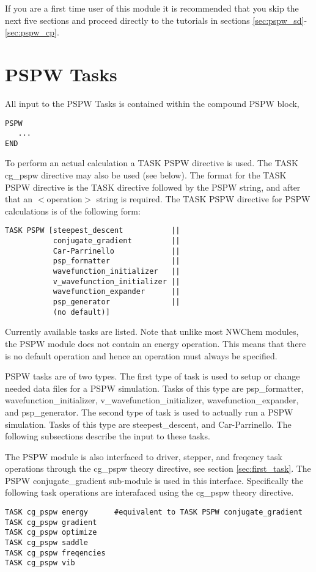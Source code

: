 If you are a first time user of this module it is recommended that you skip
the next five sections and proceed directly to the tutorials in sections 
\ref{sec:pspw_sd}-\ref{sec:pspw_cp}.

\section{PSPW Tasks}
\label{sec:pspw_tasks}

All input to the PSPW Tasks is contained within the compound PSPW  block,
\begin{verbatim}
PSPW
   ...
END
\end{verbatim}

To perform an actual calculation a TASK PSPW directive is used.  The TASK
cg\_pspw directive may also be used (see below).  The format for the 
TASK PSPW directive is the TASK directive followed by the 
PSPW string, and after that an $<$operation$>$ string is required.  The 
TASK PSPW directive for PSPW calculations is of the following form:
\begin{verbatim}
TASK PSPW [steepest_descent           ||
           conjugate_gradient         ||
           Car-Parrinello             ||
           psp_formatter              ||
           wavefunction_initializer   ||
           v_wavefunction_initializer ||
           wavefunction_expander      ||
           psp_generator              ||
           (no default)]
\end{verbatim}
Currently available tasks are listed.  Note that unlike most 
NWChem modules, the PSPW module does not contain an energy operation.  
This means that there is no default operation and hence an operation must 
always be specified. 

PSPW tasks are of two types.  The first type of 
task is used to setup or change needed data files for a 
PSPW simulation.  Tasks of this type are psp\_formatter, 
wavefunction\_initializer, v\_wavefunction\_initializer, 
wavefunction\_expander, and psp\_generator.  The second type 
of task is used to actually run a PSPW simulation.  Tasks 
of this type are steepest\_descent, and Car-Parrinello.
The following subsections describe the input to these tasks.

The PSPW module is also interfaced to driver, stepper, and freqency task 
operations through the cg\_pspw theory directive, see 
section \ref{sec:first_task}. The PSPW conjugate\_gradient sub-module is used
in this interface.  Specifically the following task operations 
are interafaced using the cg\_pspw theory directive.
\begin{verbatim}
TASK cg_pspw energy      #equivalent to TASK PSPW conjugate_gradient           
TASK cg_pspw gradient         
TASK cg_pspw optimize         
TASK cg_pspw saddle           
TASK cg_pspw freqencies       
TASK cg_pspw vib
\end{verbatim}


